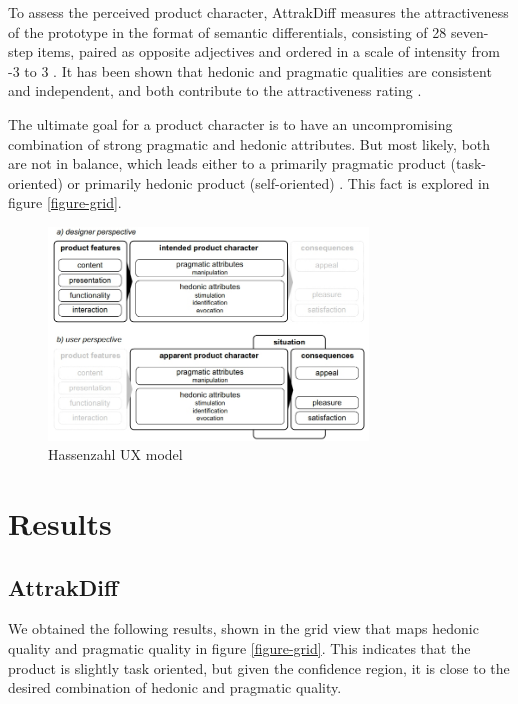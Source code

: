\documentclass[conference]{IEEEtran}
\begin{document}
To assess the perceived product character, AttrakDiff measures the
attractiveness of the prototype in the format of semantic differentials,
consisting of 28 seven-step items, paired as opposite adjectives and ordered in
a scale of intensity from -3 to 3 \cite{noauthor_AttrakDiff_nodate}. It has been
shown that hedonic and pragmatic qualities are consistent and independent, and
both contribute to the attractiveness rating \cite{article}.

The ultimate goal for a product character is to have an uncompromising
combination of strong pragmatic and hedonic attributes. But most likely, both
are not in balance, which leads either to a primarily pragmatic product
(task-oriented) or primarily hedonic product (self-oriented)
\cite{inbook_userProduct}. This fact is explored in figure \ref{figure-grid}.


\begin{figure}[t!]
\centering
\includegraphics[width=8.5cm]{AttrakDiff/ux.jpg}
\caption{\label{figure-ux}Hassenzahl UX model \cite{inbook_userProduct}}
\end{figure}

\section{Results}
\label{sec:org605c25b}

\subsection{AttrakDiff}
\label{sec:org6acc54b}
We obtained the following results, shown in the grid view that maps hedonic
quality and pragmatic quality in figure \ref{figure-grid}. This indicates that the
product is slightly task oriented, but given the confidence region, it is close
to the desired combination of hedonic and pragmatic quality.
\end{document}
